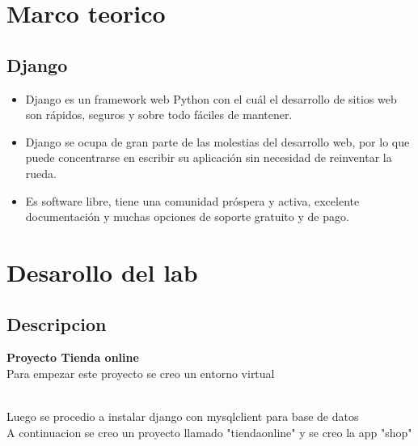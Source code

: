 \documentclass{article}
\begin{document}
\maketitle


\section{Marco teorico}


\subsection{Django}

    \begin{itemize}
        \item Django es un framework web Python con el cuál el desarrollo de sitios web son rápidos, seguros y sobre todo fáciles de mantener.
        \item Django se ocupa de gran parte de las molestias del desarrollo web, por lo que puede concentrarse en escribir su aplicación sin necesidad de reinventar la rueda.
        \item Es software libre, tiene una comunidad próspera y activa, excelente documentación y muchas opciones de soporte gratuito y de pago.
    \end{itemize}


\section{Desarollo del lab}
\subsection{Descripcion}
\textbf{Proyecto Tienda online}
\\Para empezar este proyecto se creo un entorno virtual

\\Luego se procedio a instalar django con mysqlclient para base de datos
\\A continuacion se creo un proyecto llamado "tiendaonline" y se creo la app "shop"
\end{document}
